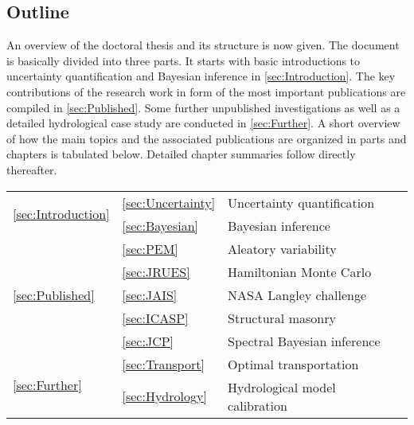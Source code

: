 \begin{refsection}
\section{Outline}
An overview of the doctoral thesis and its structure is now given.
The document is basically divided into three parts.
It starts with basic introductions to uncertainty quantification and Bayesian inference in \cref{sec:Introduction}.
The key contributions of the research work in form of the most important publications are compiled in \cref{sec:Published}.
Some further unpublished investigations as well as a detailed hydrological case study are conducted in \cref{sec:Further}.
A short overview of how the main topics and the associated publications are organized in parts and chapters is tabulated below.
Detailed chapter summaries follow directly thereafter.
\begin{table}[htbp]
  \centering
  \begin{tabular}{llll}
    \toprule
    \multirow{2}{*}{\cref{sec:Introduction}} & \cref{sec:Uncertainty} & Uncertainty quantification     & \\
                                             & \cref{sec:Bayesian}    & Bayesian inference             & \\
    \midrule
    \multirow{5}{*}{\cref{sec:Published}}    & \cref{sec:PEM}         & Aleatory variability           & \cite{Nagel:PEM2016} \\
                                             & \cref{sec:JRUES}       & Hamiltonian Monte Carlo        & \cite{Nagel:JRUES2016} \\
                                             & \cref{sec:JAIS}        & NASA Langley challenge         & \cite{Nagel:JAIS2015} \\
                                             & \cref{sec:ICASP}       & Structural masonry             & \cite{Nagel:ICASP2015:Proc} \\
                                             & \cref{sec:JCP}         & Spectral Bayesian inference    & \cite{Nagel:JCP2016} \\
    \midrule
    \multirow{2}{*}{\cref{sec:Further}}      & \cref{sec:Transport}   & Optimal transportation         & \\
                                             & \cref{sec:Hydrology}   & Hydrological model calibration & \\
    \bottomrule
  \end{tabular}
\end{table}


\end{refsection}
